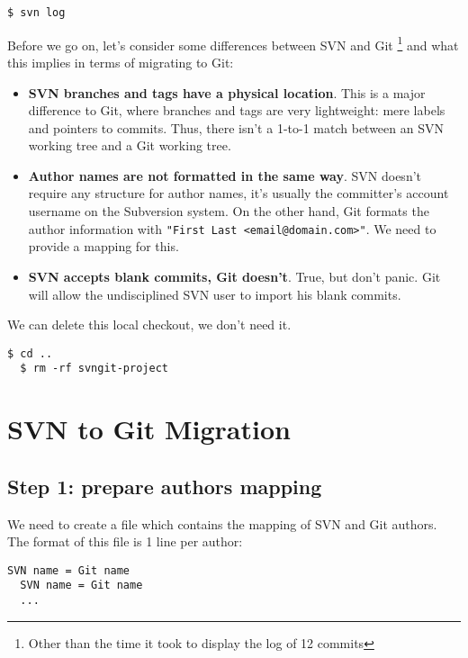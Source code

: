 \documentclass{../../common/tufte-latex/tufte-handout}
\begin{document}
\begin{lstlisting}[style=BashInputStyle]
  $ svn log
\end{lstlisting}

Before we go on, let's consider some differences between SVN and Git \footnote{Other than the time it took to display the log of 12 commits} and what this implies in terms of migrating to Git:

\begin{itemize}
 \item \textbf{SVN branches and tags have a physical location}. This is a major difference to Git, where branches and tags are very lightweight: mere labels and pointers to commits. Thus, there isn't a 1-to-1 match between an SVN working tree and a Git working tree.
 \item \textbf{Author names are not formatted in the same way}. SVN doesn't require any structure for author names, it's usually the committer's account username on the Subversion system. On the other hand, Git formats the author information with \texttt{"First Last <email@domain.com>"}. We need to provide a mapping for this.
 \item \textbf{SVN accepts blank commits, Git doesn't}. True, but don't panic. Git will allow the undisciplined SVN user to import his blank commits.
\end{itemize}

We can delete this local checkout, we don't need it.

\begin{lstlisting}[style=BashInputStyle]
  $ cd ..
  $ rm -rf svngit-project
\end{lstlisting}

\section{SVN to Git Migration}

\subsection{Step 1: prepare authors mapping}
We need to create a file which contains the mapping of SVN and Git authors.
The format of this file is 1 line per author:

\begin{lstlisting}[style=BashInputStyle]
  SVN name = Git name
  SVN name = Git name
  ...
\end{lstlisting}
\end{document}
